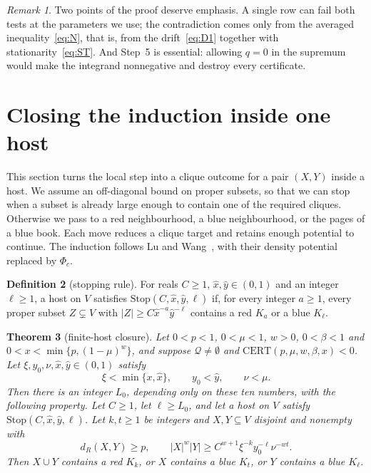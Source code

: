 \documentclass[11pt]{article}
\newtheorem{theorem}{Theorem}[section]
\theoremstyle{definition}
\newtheorem{definition}[theorem]{Definition}
\theoremstyle{remark}
\newtheorem{remark}[theorem]{Remark}
\newcommand{\cert}{\mathrm{CERT}}
\newcommand{\feas}{\mathcal Q}
\begin{document}
\begin{remark}
Two points of the proof deserve emphasis. A single row can fail both tests at the parameters we use; the contradiction
comes only from the averaged inequality~\eqref{eq:N}, that is, from the drift~\eqref{eq:D1} together with
stationarity~\eqref{eq:ST}. And Step~5 is essential: allowing $q=0$ in the supremum would make the integrand nonnegative
and destroy every certificate.
\end{remark}

\section{Closing the induction inside one host}\label{sec:closure}

This section turns the local step into a clique outcome for a pair $(X,Y)$ inside a host.
We assume an off-diagonal bound on proper subsets, so that we can stop when a subset is already large enough
to contain one of the required cliques. Otherwise we pass to a red neighbourhood, a blue neighbourhood,
or the pages of a blue book. Each move reduces a clique target and retains enough potential to continue.
The induction follows Lu and Wang~\cite[Lemma A.1]{LW}, with their density potential replaced by $\Phi_c$.

\begin{definition}[stopping rule]
For reals $C\ge1$, $\hat x,\hat y\in(0,1)$ and an integer $\ell\ge1$, a host on $V$ satisfies
$\mathrm{Stop}(C,\hat x,\hat y,\ell)$ if, for every integer $a\ge1$, every proper subset $Z\subsetneq V$ with
$|Z|\ge C\hat x^{-a}\hat y^{-\ell}$ contains a red $K_a$ or a blue $K_\ell$.
\end{definition}

\begin{theorem}[finite-host closure]\label{thm:closure}
Let $0<p<1$, $0<\mu<1$, $w>0$, $0<\beta<1$ and $0<x<\min\{p,(1-\mu)^w\}$, and suppose $\feas\ne\emptyset$ and
$\cert(p,\mu,w,\beta,x)<0$. Let $\xi,y_0,\nu,\hat x,\hat y\in(0,1)$ satisfy
\[
\xi<\min\{x,\hat x\},\qquad y_0<\hat y,\qquad \nu<\mu.
\]
Then there is an integer $L_0$, depending only on these ten numbers, with the following property. Let $C\ge1$, let
$\ell\ge L_0$, and let a host on $V$ satisfy $\mathrm{Stop}(C,\hat x,\hat y,\ell)$. Let $k,t\ge1$ be integers and
$X,Y\subseteq V$ disjoint and nonempty with
\[
d_R(X,Y)\ge p,\qquad |X|^w|Y|\ge C^{w+1}\xi^{-k}y_0^{-\ell}\nu^{-wt}.
\]
Then $X\cup Y$ contains a red $K_k$, or $X$ contains a blue $K_t$, or $Y$ contains a blue $K_\ell$.
\end{theorem}
\end{document}

